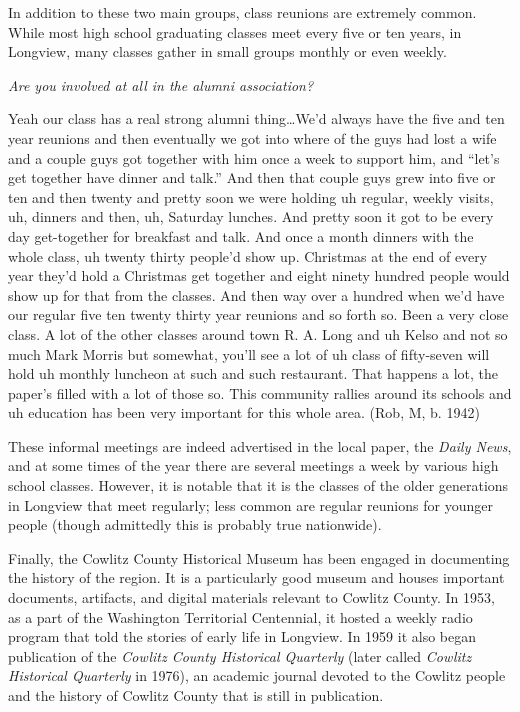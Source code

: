 In addition to these two main groups, class reunions are extremely common. While most high school graduating classes meet every five or ten years, in Longview, many classes gather in small groups monthly or even weekly.
\begin{num_quote}
    \textit{Are you involved at all in the alumni association?}

    Yeah our class has a real strong alumni thing\ldots We'd always have the five and ten year reunions and then eventually we got into where of the guys had lost a wife and a couple guys got together with him once a week to support him, and ``let's get together have dinner and talk.'' And then that couple guys grew into five or ten and then twenty and pretty soon we were holding uh regular, weekly visits, uh, dinners and then, uh, Saturday lunches. And pretty soon it got to be every day get-together for breakfast and talk. And once a month dinners with the whole class, uh twenty thirty people'd show up. Christmas at the end of every year they'd hold a Christmas get together and eight ninety hundred people would show up for that from the classes. And then way over a hundred when we'd have our regular five ten twenty thirty year reunions and so forth so. Been a very close class. A lot of the other classes around town R. A. Long and uh Kelso and not so much Mark Morris but somewhat, you'll see a lot of uh class of fifty-seven will hold uh monthly luncheon at such and such restaurant. That happens a lot, the paper's filled with a lot of those so. This community rallies around its schools and uh education has been very important for this whole area. (Rob, M, b. 1942)
\end{num_quote}
These informal meetings are indeed advertised in the local paper, the \textit{Daily News}, and at some times of the year there are several meetings a week by various high school classes. However, it is notable that it is the classes of the older generations in Longview that meet regularly; less common are regular reunions for younger people (though admittedly this is probably true nationwide).

Finally, the Cowlitz County Historical Museum has been engaged in documenting the history of the region. It is a particularly good museum and houses important documents, artifacts, and digital materials relevant to Cowlitz County. In 1953, as a part of the Washington Territorial Centennial, it hosted a weekly radio program that told the stories of early life in Longview. In 1959 it also began publication of the \textit{Cowlitz County Historical Quarterly} (later called \textit{Cowlitz Historical Quarterly} in 1976), an academic journal devoted to the Cowlitz people and the history of Cowlitz County that is still in publication.


